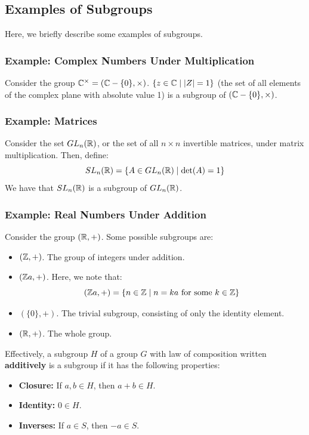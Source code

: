 \documentclass[letterpaper]{article}
\begin{document}
\subsection{Examples of Subgroups}
Here, we briefly describe some examples of subgroups. 

\subsubsection{Example: Complex Numbers Under Multiplication}
Consider the group $\mathbb{C}^{\times} = (\mathbb{C} - \{0\}, \times)$. $\{z \in \mathbb{C} \mid |Z| = 1\}$ (the set of all elements of the complex plane with absolute value 1) is a subgroup of $(\mathbb{C} - \{0\}, \times)$. 

\subsubsection{Example: Matrices}
Consider the set $GL_{n}(\mathbb{R})$, or the set of all $n \times n$ invertible matrices, under matrix multiplication. Then, define: 
\[SL_{n}(\mathbb{R}) = \{A \in GL_{n}(\mathbb{R}) \mid \det(A) = 1\}\]
We have that $SL_{n}(\mathbb{R})$ is a subgroup of $GL_{n}(\mathbb{R})$. 

\subsubsection{Example: Real Numbers Under Addition}
Consider the group $(\mathbb{R}, +)$. Some possible subgroups are: 
\begin{itemize}
    \item $(\mathbb{Z}, +)$. The group of integers under addition. 
    \item $(\mathbb{Z} a, +)$. Here, we note that:
    \[(\mathbb{Z} a, +) = \{n \in \mathbb{Z} \mid n = ka \text{ for some } k \in \mathbb{Z}\}\]
    \item $(\{0\}, +)$. The trivial subgroup, consisting of only the identity element.
    \item $(\mathbb{R}, +)$. The whole group. 
\end{itemize}

Effectively, a subgroup $H$ of a group $G$ with law of composition written \textbf{additively} is a subgroup if it has the following properties: 
\begin{itemize}
    \item \textbf{Closure:} If $a, b \in H$, then $a + b \in H$. 
    \item \textbf{Identity:} $0 \in H$. 
    \item \textbf{Inverses:} If $a \in S$, then $-a \in S$. 
\end{itemize}
\end{document}
